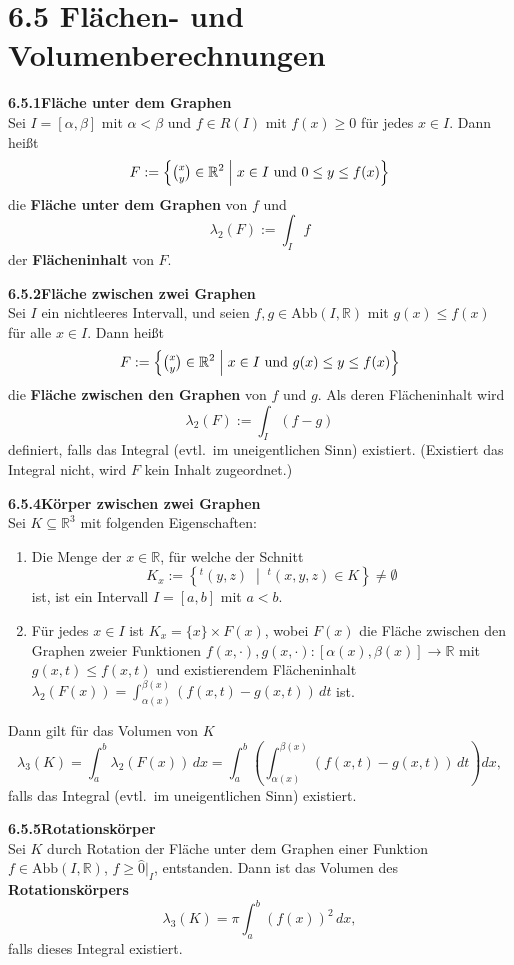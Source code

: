 \documentclass[a4paper,12pt]{article}
\newcommand{\gentry}[3]{%
  \noindent\textbf{#1\quad #2}\nopagebreak\\[0.2em]
  #3\par\smallskip
}
\begin{document}
\section*{6.5 \quad Flächen- und Volumenberechnungen}

\gentry{6.5.1}{Fläche unter dem Graphen}{%
  Sei $I = [\alpha, \beta]$ mit $\alpha < \beta$ und $f \in R(I)$ mit $f(x) \geq 0$ für
  jedes $x \in I$. Dann heißt
  \[
    F := \left\{ \tbinom{x}{y} \in \mathbb{R}^2 \;\middle|\; x \in I \text{ und } 0 \leq y \leq f(x) \right\}
  \]
  die \textbf{Fläche unter dem Graphen} von $f$ und
  \[
    \lambda_2(F) := \int_I f
  \]
  der \textbf{Flächeninhalt} von $F$.
}

\gentry{6.5.2}{Fläche zwischen zwei Graphen}{%
  Sei $I$ ein nichtleeres Intervall, und seien $f, g \in \mathrm{Abb}(I, \mathbb{R})$ mit
  $g(x) \leq f(x)$ für alle $x \in I$. Dann heißt
  \[
    F := \left\{ \tbinom{x}{y} \in \mathbb{R}^2 \;\middle|\; x \in I \text{ und } g(x) \leq y \leq f(x) \right\}
  \]
  die \textbf{Fläche zwischen den Graphen} von $f$ und $g$. Als deren Flächeninhalt
  wird
  \[
    \lambda_2(F) := \int_I (f - g)
  \]
  definiert, falls das Integral (evtl.\ im uneigentlichen Sinn) existiert. (Existiert das
  Integral nicht, wird $F$ kein Inhalt zugeordnet.)
}

\gentry{6.5.4}{Körper zwischen zwei Graphen}{%
  Sei $K \subseteq \mathbb{R}^3$ mit folgenden Eigenschaften:
  \begin{enumerate}[label=(\roman*),topsep=2pt,itemsep=1pt]
    \item Die Menge der $x \in \mathbb{R}$, für welche der \glqq{}Schnitt\grqq{}
          \[
            K_x := \left\{ {}^t(y,z) \;\middle|\; {}^t(x,y,z) \in K \right\} \neq \emptyset
          \]
          ist, ist ein Intervall $I = [a, b]$ mit $a < b$.
    \item Für jedes $x \in I$ ist $K_x = \{x\} \times F(x)$, wobei $F(x)$ die Fläche zwischen
          den Graphen zweier Funktionen
          $f(x, \cdot), g(x, \cdot) : [\alpha(x), \beta(x)] \longrightarrow \mathbb{R}$
          mit $g(x,t) \leq f(x,t)$ und existierendem Flächeninhalt
          $\lambda_2(F(x)) = \int_{\alpha(x)}^{\beta(x)} (f(x,t) - g(x,t))\, dt$ ist.
  \end{enumerate}
  Dann gilt für das Volumen von $K$
  \[
    \lambda_3(K) = \int_a^b \lambda_2(F(x))\, dx = \int_a^b \left( \int_{\alpha(x)}^{\beta(x)} (f(x,t) - g(x,t))\, dt \right) dx,
  \]
  falls das Integral (evtl.\ im uneigentlichen Sinn) existiert.
}

\gentry{6.5.5}{Rotationskörper}{%
  Sei $K$ durch Rotation der Fläche unter dem Graphen einer Funktion
  $f \in \mathrm{Abb}(I, \mathbb{R})$, $f \geq \widehat{0}|_I$, entstanden. Dann ist das
  Volumen des \textbf{Rotationskörpers}
  \[
    \lambda_3(K) = \pi \int_a^b (f(x))^2\, dx,
  \]
  falls dieses Integral existiert.
}
\end{document}
